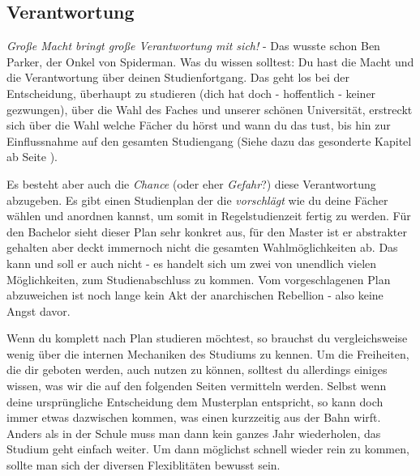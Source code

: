 \subsection{Verantwortung}
\textit{Große Macht bringt große Verantwortung mit sich!} - Das wusste schon Ben Parker, der Onkel von Spiderman. Was du wissen solltest: Du hast die Macht und die Verantwortung über deinen Studienfortgang. Das geht los bei der Entscheidung, überhaupt zu studieren (dich hat doch - hoffentlich - keiner gezwungen), über die Wahl des Faches und unserer schönen Universität, erstreckt sich über die Wahl welche Fächer du hörst und wann du das tust, bis hin zur Einflussnahme auf den gesamten Studiengang (Siehe dazu das gesonderte Kapitel ab Seite \pageref{politik}).

Es besteht aber auch die \textit{Chance} (oder eher \textit{Gefahr}?) diese Verantwortung abzugeben. Es gibt einen Studienplan der die \textit{vorschlägt} wie du deine Fächer wählen und anordnen kannst, um somit in Regelstudienzeit fertig zu werden. Für den Bachelor sieht dieser Plan sehr konkret aus, für den Master ist er abstrakter gehalten aber deckt immernoch nicht die gesamten Wahlmöglichkeiten ab. Das kann und soll er auch nicht - es handelt sich um zwei von unendlich vielen Möglichkeiten, zum Studienabschluss zu kommen. Vom vorgeschlagenen Plan abzuweichen ist noch lange kein Akt der anarchischen Rebellion - also keine Angst davor.

Wenn du komplett nach Plan studieren möchtest, so brauchst du vergleichsweise wenig über die internen Mechaniken des Studiums zu kennen. Um die Freiheiten, die dir geboten werden, auch nutzen zu können, solltest du allerdings einiges wissen, was wir die auf den folgenden Seiten vermitteln werden. Selbst wenn deine ursprüngliche Entscheidung dem Musterplan entspricht, so kann doch immer etwas dazwischen kommen, was einen kurzzeitig aus der Bahn wirft. Anders als in der Schule muss man dann kein ganzes Jahr wiederholen, das Studium geht einfach weiter. Um dann möglichst schnell wieder rein zu kommen, sollte man sich der diversen Flexiblitäten bewusst sein.